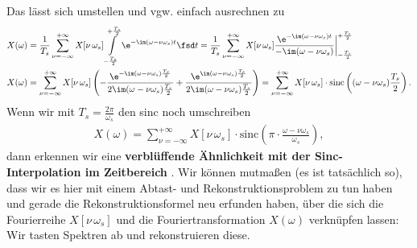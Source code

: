 Das lässt sich umstellen und vgw. einfach ausrechnen zu
\begin{align}
&X(\omega) = \frac{1}{T_s}\sum_{\nu=-\infty}^{+\infty} X[\nu\,\omega_s]
\int\limits_{-\frac{T_s}{2}}^{+\frac{T_s}{2}}
\e^{-\im (\omega-\nu\omega_s) t} \fsd t=
\frac{1}{T_s}\sum_{\nu=-\infty}^{+\infty} X[\nu\,\omega_s]
\frac{\e^{-\im (\omega-\nu\omega_s) t}}{-\im (\omega-\nu\omega_s)}
\bigg|_{-\frac{T_s}{2}}^{+\frac{T_s}{2}}\\
&X(\omega) = \sum_{\nu=-\infty}^{+\infty} X[\nu\,\omega_s]\left(
-\frac{\e^{-\im (\omega-\nu\omega_s)\frac{T_s}{2}}}{2 \im (\omega-\nu\omega_s) \frac{T_s}{2}}+
\frac{\e^{\im (\omega-\nu\omega_s)\frac{T_s}{2}}}{2 \im (\omega-\nu\omega_s) \frac{T_s}{2}}\right)
=
\sum_{\nu=-\infty}^{+\infty} X[\nu\,\omega_s] \cdot
\mathrm{sinc}\left((\omega-\nu\omega_s)\frac{T_s}{2}\right).
\end{align}
Wenn wir mit $T_s=\frac{2\pi}{\omega_s}$ den sinc noch umschreiben
\begin{align}
\label{eq:SamplingFreqSincInterp}
X(\omega) = \sum_{\nu=-\infty}^{+\infty} X[\nu\,\omega_s] \cdot
\mathrm{sinc}\left(\pi\cdot\frac{\omega-\nu\omega_s}{\omega_s}\right),
\end{align}
dann erkennen wir eine \textbf{verblüffende Ähnlichkeit mit der Sinc-Interpolation
im Zeitbereich} .
%
Wir können mutmaßen (es ist tatsächlich so), dass wir es hier mit einem
Abtast- und Rekonstruktionsproblem zu tun haben und gerade die Rekonstruktionsformel
neu erfunden haben, über die sich die Fourierreihe $X[\nu\,\omega_s]$
und die Fouriertransformation $X(\omega)$
verknüpfen lassen: Wir tasten Spektren ab und rekonstruieren diese.

